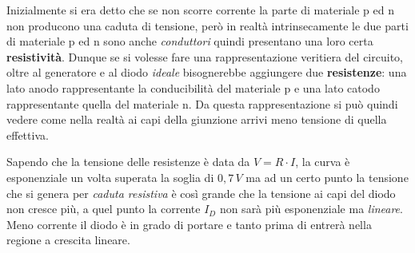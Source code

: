\documentclass[12pt, a4paper]{report}
\begin{document}
Inizialmente si era detto che se non scorre corrente la parte di materiale p ed n non producono una caduta di tensione, però in realtà intrinsecamente le due parti di materiale p ed n sono anche \textit{conduttori} quindi presentano una loro certa \textbf{resistività}. Dunque se si volesse fare una rappresentazione veritiera del circuito, oltre al generatore e al diodo \textit{ideale} bisognerebbe aggiungere due \textbf{resistenze}: una lato anodo rappresentante la conducibilità del materiale p e una lato catodo rappresentante quella del materiale n. Da questa rappresentazione si può quindi vedere come nella realtà ai capi della giunzione arrivi meno tensione di quella effettiva. 

Sapendo che la tensione delle resistenze è data da $V = R \cdot I$, la curva è esponenziale un volta superata la soglia di $0,7\,V$ ma ad un certo punto la tensione che si genera per \textit{caduta resistiva} è così grande che la tensione ai capi del diodo non cresce più, a quel punto la corrente $I_{D}$ non sarà più esponenziale ma \textit{lineare}. Meno corrente il diodo è in grado di portare e tanto prima di entrerà nella regione a crescita lineare.
\end{document}
